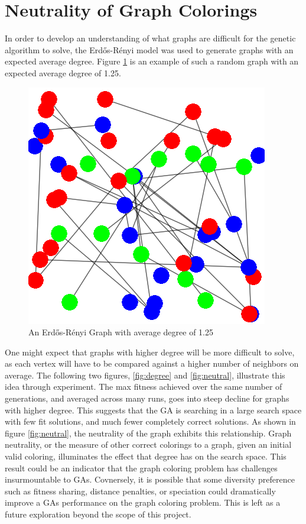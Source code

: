 \documentclass{article}
\begin{document}
\section{Neutrality of Graph Colorings}

	In order to develop an understanding of what graphs are difficult for the genetic algorithm to solve, the Erd\H{o}s-R\'{e}nyi model was used to generate graphs with an expected average degree. Figure \ref{fig:erdos} is an example of such a random graph with an expected average degree of 1.25.\par

	\begin{figure}
		\centering
		\includegraphics[scale = 0.25]{erdos.png}
		\caption{An Erd\H{o}s-R\'{e}nyi Graph with average degree of 1.25}
		\label{fig:erdos}
	\end{figure}

	One might expect that graphs with higher degree will be more difficult to solve, as each vertex will have to be compared against a higher number of neighbors on average. The following two figures, \ref{fig:degree} and \ref{fig:neutral}, illustrate this idea through experiment. The max fitness achieved over the same number of generations, and averaged across many runs, goes into steep decline for graphs with higher degree. This suggests that the GA is searching in a large search space with few fit solutions, and much fewer completely correct solutions. As shown in figure \ref{fig:neutral}, the neutrality of the graph exhibits this relationship. Graph neutrality, or the measure of other correct colorings to a graph, given an initial valid coloring, illuminates the effect that degree has on the search space. This result could be an indicator that the graph coloring problem has challenges insurmountable to GAs. Covnersely, it is possible that some diversity preference such as fitness sharing, distance penalties, or speciation could dramatically improve a GAs performance on the graph coloring problem. This is left as a future exploration beyond the scope of this project.
\end{document}
